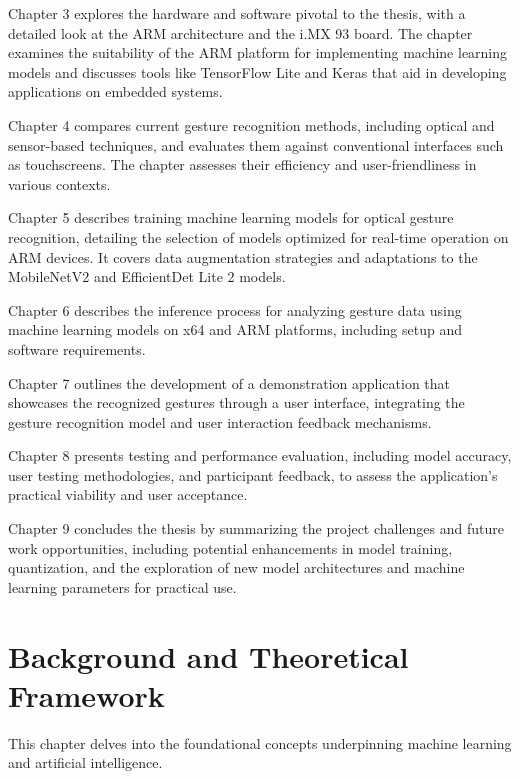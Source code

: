 Chapter 3 explores the hardware and software pivotal to the thesis, with a detailed look at the ARM architecture and the i.MX 93 board. The chapter examines the suitability of the ARM platform for implementing machine learning models and discusses tools like TensorFlow Lite and Keras that aid in developing applications on embedded systems.

Chapter 4 compares current gesture recognition methods, including optical and sensor-based techniques, and evaluates them against conventional interfaces such as touchscreens. The chapter assesses their efficiency and user-friendliness in various contexts.

Chapter 5 describes training machine learning models for optical gesture recognition, detailing the selection of models optimized for real-time operation on ARM devices. It covers data augmentation strategies and adaptations to the MobileNetV2 and EfficientDet Lite 2 models.

Chapter 6 describes the inference process for analyzing gesture data using machine learning models on x64 and ARM platforms, including setup and software requirements.

Chapter 7 outlines the development of a demonstration application that showcases the recognized gestures through a user interface, integrating the gesture recognition model and user interaction feedback mechanisms.

Chapter 8 presents testing and performance evaluation, including model accuracy, user testing methodologies, and participant feedback, to assess the application's practical viability and user acceptance.

Chapter 9 concludes the thesis by summarizing the project challenges and future work opportunities, including potential enhancements in model training, quantization, and the exploration of new model architectures and machine learning parameters for practical use.

\chapter{Background and Theoretical Framework}
This chapter delves into the foundational concepts underpinning machine learning and artificial intelligence.

\label{chap:background}


